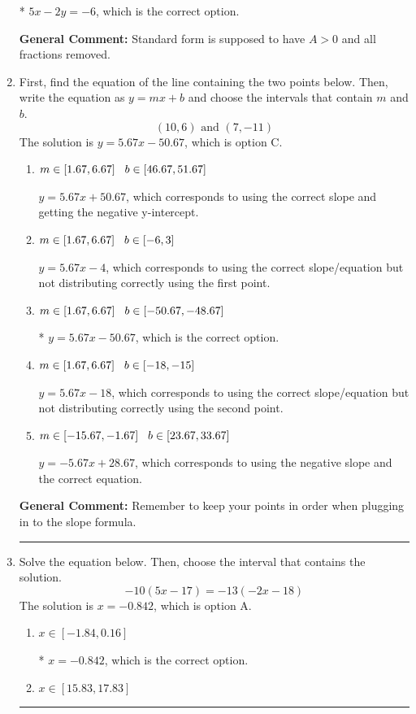 \documentclass{extbook}[14pt]
\newcommand{\litem}[1]{\item #1

\rule{\textwidth}{0.4pt}}
\begin{document}
\begin{enumerate}
{\begin{enumerate}[label=\Alph*.]
* $5x - 2y = -6$, which is the correct option.
\end{enumerate}

\textbf{General Comment:} Standard form is supposed to have $A > 0$ and all fractions removed.
}
\litem{
First, find the equation of the line containing the two points below. Then, write the equation as $ y=mx+b $ and choose the intervals that contain $m$ and $b$.
\[ (10, 6) \text{ and } (7, -11) \]
The solution is \( y = 5.67x -50.67 \), which is option C.\begin{enumerate}[label=\Alph*.]
\item \( m \in [1.67, 6.67] \hspace*{3mm} b \in [46.67, 51.67] \)

 $y = 5.67x + 50.67$, which corresponds to using the correct slope and getting the negative y-intercept.
\item \( m \in [1.67, 6.67] \hspace*{3mm} b \in [-6, 3] \)

 $y = 5.67x -4$, which corresponds to using the correct slope/equation but not distributing correctly using the first point.
\item \( m \in [1.67, 6.67] \hspace*{3mm} b \in [-50.67, -48.67] \)

* $y = 5.67x -50.67$, which is the correct option.
\item \( m \in [1.67, 6.67] \hspace*{3mm} b \in [-18, -15] \)

 $y = 5.67x -18$, which corresponds to using the correct slope/equation but not distributing correctly using the second point.
\item \( m \in [-15.67, -1.67] \hspace*{3mm} b \in [23.67, 33.67] \)

 $y = -5.67x + 28.67$, which corresponds to using the negative slope and the correct equation.
\end{enumerate}

\textbf{General Comment:} Remember to keep your points in order when plugging in to the slope formula.
}
\litem{
Solve the equation below. Then, choose the interval that contains the solution.
\[ -10(5x -17) = -13(-2x -18) \]
The solution is \( x = -0.842 \), which is option A.\begin{enumerate}[label=\Alph*.]
\item \( x \in [-1.84, 0.16] \)

* $x = -0.842$, which is the correct option.
\item \( x \in [15.83, 17.83] \)


\end{enumerate}}
\end{enumerate}
\end{document}
